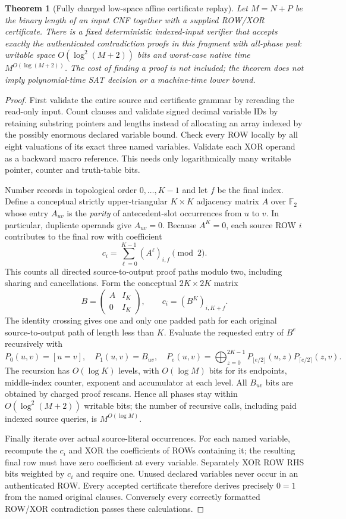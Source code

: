 \documentclass[11pt]{article}
\newtheorem{theorem}{Theorem}
\begin{document}
\begin{theorem}[Fully charged low-space affine certificate replay]
Let $M=N+P$ be the binary length of an input CNF together with a supplied ROW/XOR certificate. There is a fixed deterministic indexed-input verifier that accepts exactly the authenticated contradiction proofs in this fragment with \emph{all-phase} peak writable space $O(\log^2(M+2))$ bits and worst-case native time $M^{O(\log(M+2))}$. The cost of finding a proof is not included; the theorem does not imply polynomial-time SAT decision or a machine-time lower bound.
\end{theorem}
\begin{proof}
First validate the entire source and certificate grammar by rereading the read-only input. Count clauses and validate signed decimal variable IDs by retaining substring pointers and lengths instead of allocating an array indexed by the possibly enormous declared variable bound. Check every ROW locally by all eight valuations of its exact three named variables. Validate each XOR operand as a backward macro reference. This needs only logarithmically many writable pointer, counter and truth-table bits.

Number records in topological order $0,\dots,K-1$ and let $f$ be the final index. Define a conceptual strictly upper-triangular $K\times K$ adjacency matrix $A$ over $\mathbb F_2$ whose entry $A_{uv}$ is the \emph{parity} of antecedent-slot occurrences from $u$ to $v$. In particular, duplicate operands give $A_{uv}=0$. Because $A^K=0$, each source ROW $i$ contributes to the final row with coefficient
\[
 c_i=\sum_{\ell=0}^{K-1}(A^\ell)_{i,f}\pmod2.
\]
This counts all directed source-to-output proof paths modulo two, including sharing and cancellations. Form the conceptual $2K\times2K$ matrix
\[
 B=\begin{pmatrix}A&I_K\\0&I_K\end{pmatrix},
 \qquad c_i=(B^K)_{i,K+f}.
\]
The identity crossing gives one and only one padded path for each original source-to-output path of length less than $K$. Evaluate the requested entry of $B^e$ recursively with
\[
 P_0(u,v)=[u=v],\quad P_1(u,v)=B_{uv},\quad
 P_e(u,v)=\bigoplus_{z=0}^{2K-1}
 P_{\lfloor e/2\rfloor}(u,z)
 P_{\lceil e/2\rceil}(z,v).
\]
The recursion has $O(\log K)$ levels, with $O(\log M)$ bits for its endpoints, middle-index counter, exponent and accumulator at each level. All $B_{uv}$ bits are obtained by charged proof rescans. Hence all phases stay within $O(\log^2(M+2))$ writable bits; the number of recursive calls, including paid indexed source queries, is $M^{O(\log M)}$.

Finally iterate over actual source-literal occurrences. For each named variable, recompute the $c_i$ and XOR the coefficients of ROWs containing it; the resulting final row must have zero coefficient at every variable. Separately XOR ROW RHS bits weighted by $c_i$ and require one. Unused declared variables never occur in an authenticated ROW. Every accepted certificate therefore derives precisely $0=1$ from the named original clauses. Conversely every correctly formatted ROW/XOR contradiction passes these calculations.
\end{proof}
\end{document}
